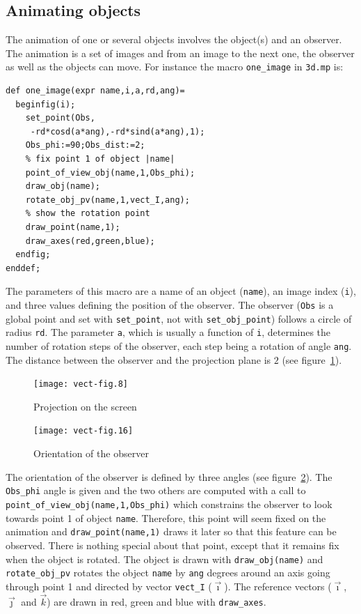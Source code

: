 \documentclass[nonumber,harvardcite]{ltugboat}
\begin{document}
\subsection{Animating objects}

The animation of one or several objects involves the object(s) and an observer.
The animation is a set of images and from an image to the next one,
the observer as well as the objects can move. For instance
the macro \verb|one_image| in \verb|3d.mp| is:

\begin{verbatim}
def one_image(expr name,i,a,rd,ang)=
  beginfig(i);
    set_point(Obs,
     -rd*cosd(a*ang),-rd*sind(a*ang),1);
    Obs_phi:=90;Obs_dist:=2;
    % fix point 1 of object |name|
    point_of_view_obj(name,1,Obs_phi);
    draw_obj(name);
    rotate_obj_pv(name,1,vect_I,ang);
    % show the rotation point      
    draw_point(name,1);
    draw_axes(red,green,blue);
  endfig;
enddef;
\end{verbatim}

The parameters of this macro are a name of an object (\verb|name|),
an image index (\verb|i|), and three values defining the position
of the observer.
The observer (\verb|Obs| is a global point and set with \verb|set_point|,
not with \verb|set_obj_point|)
follows a circle of radius \verb|rd|. 
The parameter \verb|a|, which is usually a function of \verb|i|, 
determines the number of rotation steps
of the observer, each step being a rotation of angle \verb|ang|. 
The distance between the observer and the 
projection plane is $2$ (see figure~\ref{proj-screen}).

\begin{figure}
\begin{center}
  \texttt{[image: vect-fig.8]}
\end{center}
\caption{Projection on the screen}\label{proj-screen}
\end{figure}

\begin{figure}
\begin{center}
  \texttt{[image: vect-fig.16]}
\end{center}
\caption{Orientation of the observer}\label{obs-orientation}
\end{figure}


The orientation of the observer is defined by three angles 
(see figure~\ref{obs-orientation}). The \verb|Obs_phi| angle
is given and the two others are computed with a call to 
\verb|point_of_view_obj(name,1,Obs_phi)| which constrains the observer
to look towards point 1 of object \verb|name|. Therefore, this 
point will seem fixed on the animation and \verb|draw_point(name,1)| 
draws it later so that this feature can be observed.
There is nothing special about that point, except that it
remains fix when the object is rotated. The object is drawn
with \verb|draw_obj(name)| and 
\verb|rotate_obj_pv|  rotates the object \verb|name|
by \verb|ang| degrees around an axis going through point 1 
and directed by vector \verb|vect_I| ($\vec{\imath}$). 
The reference vectors ($\vec\imath$,
$\vec\jmath$ and $\vec k$) are drawn in red, green and blue with 
\verb|draw_axes|.
\end{document}
